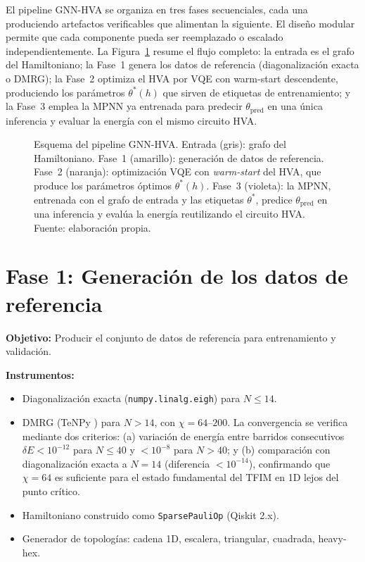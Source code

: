 \documentclass[11pt,a4paper,spanish]{book}
\begin{document}
El pipeline GNN-HVA se organiza en tres fases secuenciales, cada una produciendo artefactos verificables que alimentan la siguiente. El diseño modular permite que cada componente pueda ser reemplazado o escalado independientemente. La Figura~\ref{fig:pipeline} resume el flujo completo: la entrada es el grafo del Hamiltoniano; la Fase~1 genera los datos de referencia (diagonalización exacta o DMRG); la Fase~2 optimiza el HVA por VQE con warm-start descendente, produciendo los parámetros $\theta^*(h)$ que sirven de etiquetas de entrenamiento; y la Fase~3 emplea la MPNN ya entrenada para predecir $\theta_{\text{pred}}$ en una única inferencia y evaluar la energía con el mismo circuito HVA.

\begin{figure}[H]
\centering
\bgroup\shorthandoff{<>}
\resizebox{\textwidth}{!}{}
\egroup
\caption[Esquema del pipeline GNN-HVA en tres fases]{Esquema del pipeline GNN-HVA. Entrada (gris): grafo del Hamiltoniano. Fase~1 (amarillo): generación de datos de referencia. Fase~2 (naranja): optimización VQE con \emph{warm-start} del HVA, que produce los parámetros óptimos $\theta^*(h)$. Fase~3 (violeta): la MPNN, entrenada con el grafo de entrada y las etiquetas $\theta^*$, predice $\theta_{\text{pred}}$ en una inferencia y evalúa la energía reutilizando el circuito HVA. Fuente: elaboración propia.}
\label{fig:pipeline}
\end{figure}

\section{Fase 1: Generación de los datos de referencia}
\label{sec:fase1}

\textbf{Objetivo:} Producir el conjunto de datos de referencia para entrenamiento y validación.

\textbf{Instrumentos:}
\begin{itemize}
    \item Diagonalización exacta (\texttt{numpy.linalg.eigh}) para $N \leq 14$.
    \item DMRG (TeNPy \citep{hauschild2018}) para $N > 14$, con $\chi = 64$--$200$. La convergencia se verifica mediante dos criterios: (a) variación de energía entre barridos consecutivos $\delta E < 10^{-12}$ para $N \leq 40$ y $< 10^{-8}$ para $N > 40$; y (b) comparación con diagonalización exacta a $N = 14$ (diferencia $< 10^{-14}$), confirmando que $\chi = 64$ es suficiente para el estado fundamental del TFIM en 1D lejos del punto crítico.
    \item Hamiltoniano construido como \texttt{SparsePauliOp} (Qiskit 2.x).
    \item Generador de topologías: cadena 1D, escalera, triangular, cuadrada, heavy-hex.
\end{itemize}
\end{document}
